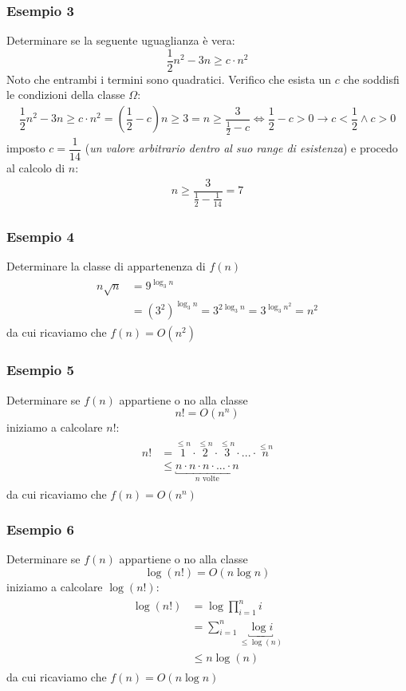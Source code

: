 \documentclass[italian]{article}
\newcommand{\varOmicron}{O}
\begin{document}
\subsubsection{Esempio 3}
Determinare se la seguente uguaglianza è vera:
\[
	\dfrac{1}{2}n^2-3n \geq c\cdot n^2
\]
Noto che entrambi i termini sono quadratici. Verifico che esista un $c$ che soddisfi le condizioni della classe $\varOmega$:
\begin{gather*}
	\dfrac{1}{2}n^2 - 3n \geq c\cdot n^2 = \left( \dfrac{1}{2} -c \right)n \geq 3 = n \geq \dfrac{3}{\frac{1}{2} - c}\iff 
	\dfrac{1}{2} - c > 0 \to c < \dfrac{1}{2} \land c > 0
\end{gather*}
imposto $c=\dfrac{1}{14}$ (\textit{un valore arbitrario dentro al suo range di esistenza}) e procedo al calcolo di $n$:
\begin{gather*}
	n \geq \dfrac{3}{\frac{1}{2} - \frac{1}{14}} = 7
\end{gather*}

\subsubsection{Esempio 4}
Determinare la classe di appartenenza di $f(n)$
\begin{gather*}
	\begin{align*}
		n\sqrt{n} &= 9^{\log_3n} \\
		&= (3^2)^{\log_3n} = 3^{2\log_3n} = 3^{\log_3n^2} = n^2
	\end{align*}
\end{gather*}
da cui ricaviamo che $f(n) = \varOmicron(n^2)$

\subsubsection{Esempio 5}
Determinare se $f(n)$ appartiene o no alla classe
\[
	n! = \varOmicron(n^n)
\]
iniziamo a calcolare $n!$:
\begin{gather*}
	\begin{align*}
		n! &= \overset{\leq n}{1} \cdot \overset{\leq n}{2} \cdot \overset{\leq n}{3} \cdot ... \cdot \overset{\leq n}{n} \\
		&\leq \underbracket{n\cdot n \cdot n \cdot ... \cdot n}_{\text{$n$ volte}}
	\end{align*}
\end{gather*}
da cui ricaviamo che $f(n) = \varOmicron(n^n)$

\subsubsection{Esempio 6}
Determinare se $f(n)$ appartiene o no alla classe
\[
	\log(n!) = \varOmicron(n\log n)
\]
iniziamo a calcolare $\log(n!)$:
\begin{gather*}
\begin{align*}
	\log(n!) &= \log \prod_{i=1}^{n} i \\
	&= \sum_{i=1}^{n} \underbracket{\log i}_{\leq \log(n)} \\
	&\leq n\log(n)
\end{align*}
\end{gather*}
da cui ricaviamo che $f(n) = \varOmicron(n\log n)$
\pagebreak
\end{document}
